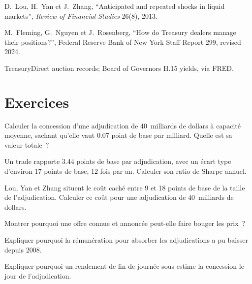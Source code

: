 \begin{omsources}
\item D.~Lou, H.~Yan et J.~Zhang, ``Anticipated and repeated shocks in liquid markets'', \emph{Review of Financial Studies} 26(8), 2013.
\item M.~Fleming, G.~Nguyen et J.~Rosenberg, ``How do Treasury dealers manage their positions?'', Federal Reserve Bank of New York Staff Report 299,
revised 2024.
\item TreasuryDirect auction records; Board of Governors H.15 yields, via FRED.
\end{omsources}

\section{Exercices}

\begin{exercise}[$\star$]\label{exo:s2:supply-trades:1}
Calculer la concession d'une adjudication de 40~milliards de dollars à capacité moyenne, sachant qu'elle vaut 0.07 point de base par milliard. Quelle est sa valeur totale~?
\end{exercise}

\begin{exercise}[$\star$]\label{exo:s2:supply-trades:2}
Un trade rapporte 3.44 points de base par adjudication, avec un écart type d'environ 17 points de base, 12 fois par an. Calculer son ratio de Sharpe annuel.
\end{exercise}

\begin{exercise}[$\star$]\label{exo:s2:supply-trades:3}
Lou, Yan et Zhang situent le coût caché entre 9 et 18 points de base de la taille de l'adjudication. Calculer ce coût pour une adjudication de 40~milliards de dollars.
\end{exercise}

\begin{exercise}[$\star\star$]\label{exo:s2:supply-trades:4}
Montrer pourquoi une offre connue et annoncée peut-elle faire bouger les prix~?
\end{exercise}

\begin{exercise}[$\star\star$]\label{exo:s2:supply-trades:5}
Expliquer pourquoi la rémunération pour absorber les adjudications a pu baisser depuis 2008.
\end{exercise}

\begin{exercise}[$\star\star$]\label{exo:s2:supply-trades:6}
Expliquer pourquoi un rendement de fin de journée sous-estime la concession le jour de l'adjudication.
\end{exercise}

